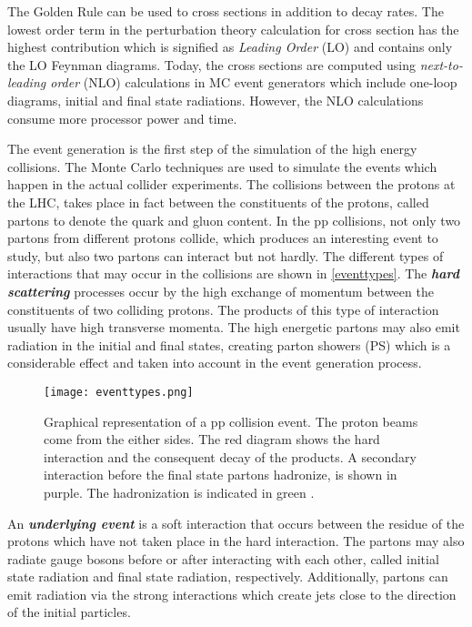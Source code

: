 The Golden Rule can be used to cross sections in addition to decay rates. The lowest order term in the perturbation theory calculation for cross section has the highest contribution which is signified as \emph{Leading Order} (LO) and contains only the LO Feynman diagrams. Today, the cross sections are computed using \emph{next-to-leading order} (NLO) calculations in MC event generators which include one-loop diagrams, initial and final state radiations. However, the NLO calculations consume more processor power and time. 

The event generation is the first step of the simulation of the high energy collisions. The Monte Carlo techniques are used to simulate the events which happen in the actual collider experiments. The collisions between the protons at the LHC, takes place in fact between the constituents of the protons, called partons to denote the quark and gluon content. In the pp collisions, not only two partons from different protons collide, which produces an interesting event to study, but also two partons can interact but not hardly. The different types of interactions that may occur in the collisions are shown in \autoref{eventtypes}. The \emph{\bf{hard scattering}} processes occur by the high exchange of momentum between the constituents of two colliding protons. The products of this type of interaction usually have high transverse momenta. The high energetic partons may also emit radiation in the initial and final states, creating parton showers (PS) which is a considerable effect and taken into account in the event generation process.

\begin{figure}[ht]
	\centering
	\texttt{[image: eventtypes.png]}
	\vspace{2mm}
	\caption[Graphical representation of a pp collision event. The proton beams come from the either sides. The red diagram shows the hard interaction and the consequent decay of the products. A secondary interaction before the final state partons hadronize, is shown in purple. The hadronization is indicated in green.]
	{Graphical representation of a pp collision event. The proton beams come from the either sides. The red diagram shows the hard interaction and the consequent decay of the products. A secondary interaction before the final state partons hadronize, is shown in purple. The hadronization is indicated in green \cite{Pttgen2016}.}
	\label{eventtypes}
\end{figure}

An \emph{\bf{underlying event}} is a soft interaction that occurs between the residue of the protons which have not taken place in the hard interaction. The partons may also radiate gauge bosons before or after interacting with each other, called initial state radiation and final state radiation, respectively. Additionally, partons can emit radiation via the strong interactions which create jets close to the direction of the initial particles.


